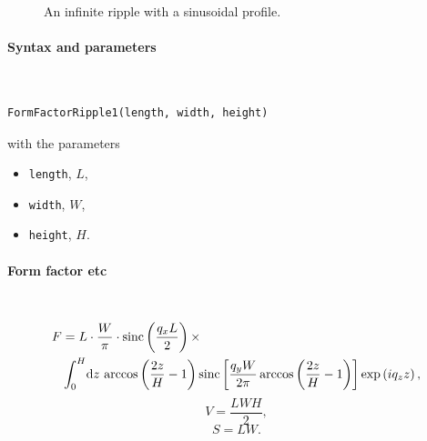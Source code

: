 \begin{figure}[H]
\hfill
{}
\hfill
{}
\hfill
{}
\hfill
\caption{An infinite ripple with a sinusoidal profile.}
\end{figure}

\paragraph{Syntax and parameters}\strut\\[-2ex plus .2ex minus .2ex]
\begin{lstlisting}[language=python, style=eclipseboxed,numbers=none,nolol]
  FormFactorRipple1(length, width, height)
\end{lstlisting}
with the parameters
\begin{itemize}
\item \texttt{length}, $L$, 
\item \texttt{width}, $W$, 
\item \texttt{height}, $H$. 
\end{itemize}


\paragraph{Form factor etc}\strut\\
\begin{align*}
F &=L \cdot \frac{W}{\pi}\cdot \operatorname{sinc}\left(\frac{q_xL}{2}\right)\times \\
&\int_0^H\!\text{d} z\, \arccos\left(\frac{2z}{H}-1\right)\operatorname{sinc}\left[\frac{q_yW}{2\pi}\arccos\left(\frac{2z}{H} - 1\right)\right]\exp\left(iq_zz\right),
\end{align*}
\begin{equation*}
  V = \dfrac{L W H}{2},
\end{equation*}
\begin{equation*}
  S = L W.
\end{equation*}

